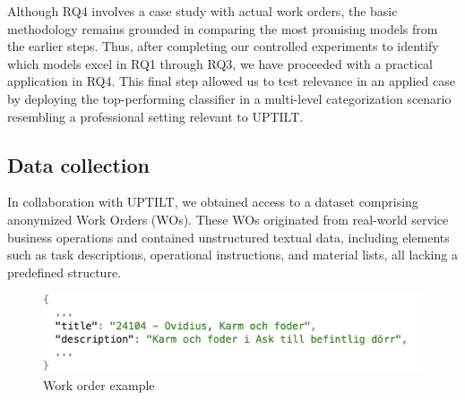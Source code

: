 Although RQ4 involves a case study with actual work orders, the basic methodology remains grounded in comparing the most promising models from the earlier steps. Thus, after completing our controlled experiments to identify which models excel in RQ1 through RQ3, we have proceeded with a practical application in RQ4. This final step allowed us to test  relevance in an applied case by deploying the top-performing classifier in a multi-level categorization scenario resembling a professional setting relevant to UPTILT.


\subsection{Data collection}
%

In collaboration with UPTILT, we obtained access to a dataset comprising anonymized Work Orders (WOs). These WOs originated from real-world service business operations and contained unstructured textual data, including elements such as task descriptions, operational instructions, and material lists, all lacking a predefined structure.
\begin{figure}
    \centering
    \includegraphics[width=1\linewidth]{images/fig4.png}
    \caption{Work order example}
    \label{fig:enter-label}
\end{figure}

